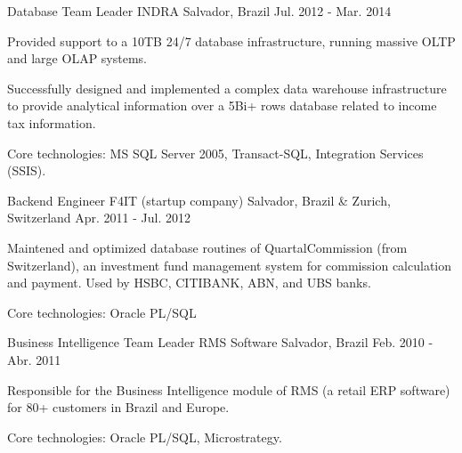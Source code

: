 \begin{cventries}

\cventry
{Database Team Leader} %
{INDRA} %
{Salvador, Brazil} %
{Jul. 2012 - Mar. 2014} %
{ %
\begin{cvitems}
	\item{Provided support to a 10TB 24/7 database infrastructure, running massive OLTP and large OLAP systems.}
	\item{Successfully designed and implemented a complex data warehouse infrastructure to provide analytical information over a 5Bi+ rows database related to income tax information.}
	\item{Core technologies: MS SQL Server 2005, Transact-SQL, Integration Services (SSIS).}
\end{cvitems} 
}


\cventry
{Backend Engineer} %
{F4IT (startup company)} %
{Salvador, Brazil \& Zurich, Switzerland} %
{Apr. 2011 - Jul. 2012} %
{ %
\begin{cvitems}
	\item{Maintened and optimized database routines of QuartalCommission (from Switzerland), an investment fund management system for commission calculation and payment. Used by HSBC, CITIBANK, ABN, and UBS banks.}
	\item{Core technologies: Oracle PL/SQL}
\end{cvitems}
}


\cventry
{Business Intelligence Team Leader} %
{RMS Software} %
{Salvador, Brazil} %
{Feb. 2010 - Abr. 2011} %
{ %
\begin{cvitems}
	\item{Responsible for the Business Intelligence module of RMS (a retail ERP software) for 80+ customers in Brazil and Europe.}
	\item{Core technologies: Oracle PL/SQL, Microstrategy.}
\end{cvitems}
}


\end{cventries}
